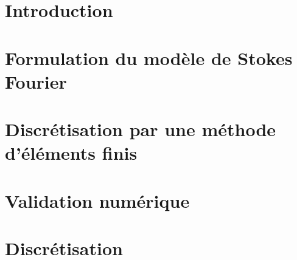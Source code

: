 \section{Introduction}
\label{sec:fourier-introduction}


\section{Formulation du modèle de Stokes Fourier}
\label{sec:fourier-model}


\section{Discrétisation par une méthode d'éléments finis}
\label{sec:fourier-discretisation}


\section{Validation numérique}
\label{sec:fourier-validation}


\section{Discrétisation}
\label{sec:fourier-application}

